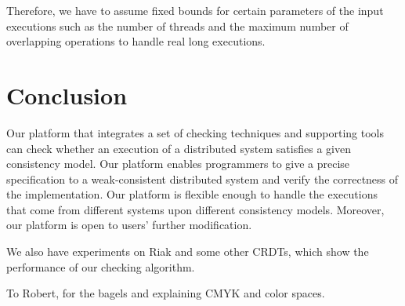 \documentclass[sigconf,review,screen,anonymous]{acmart}
\begin{document}
Therefore, we have to assume fixed bounds for certain parameters of the input executions such as the number of threads and the maximum number of overlapping operations to handle real long executions.

\section{Conclusion}
Our platform that integrates a set of checking techniques and supporting tools can check whether an execution of a distributed system satisfies a given consistency model. Our platform enables programmers to give a precise specification to a weak-consistent distributed system and verify the correctness of the implementation. Our platform is flexible enough to handle the executions that come from different systems upon different consistency models. Moreover, our platform is open to users’ further modification.

We also have experiments on Riak and some other CRDTs, which show the performance of our checking algorithm.


\begin{acks}
To Robert, for the bagels and explaining CMYK and color spaces.
\end{acks}



\end{document}
